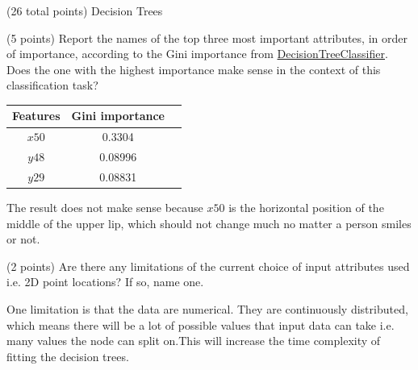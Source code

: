 \documentclass[12pt]{article}
\begin{document}
\begin{question}{(26 total points) Decision Trees}
\begin{subquestion}
\end{subquestion}


%
%
\begin{subquestion}{(5 points) 
Report the names of the top three most important attributes, in order of importance, according to the Gini importance from \href{https://scikit-learn.org/0.19/modules/generated/sklearn.tree.DecisionTreeClassifier.html}{DecisionTreeClassifier}. 
Does the one with the highest importance make sense in the context of this classification task? \\
}


\begin{answerbox}{10em}
\begin{center}
\begin{tabular}{ | c | c | c | }
 \hline
 Features & Gini importance \\ \hline 
 $x50$ & 0.3304 \\
 $y48$ & 0.08996 \\
 $y29$ & 0.08831 \\
 \hline
\end{tabular}
\end{center}
The result does not make sense because $x50$ is
the horizontal position of the middle of the upper lip, which should not change much no matter a person smiles or not.
\end{answerbox}



\end{subquestion}



%
%
\begin{subquestion}{(2 points) 
Are there any limitations of the current choice of input attributes used i.e. 2D point locations? If so, name one. 
}


\begin{answerbox}{10em}
One limitation is that the data are numerical. They are continuously distributed, which means there will be a lot of
possible values that input data can take i.e. many values the node can split on.This will increase the time complexity of fitting the decision trees.
\end{answerbox}



\end{subquestion}


\end{question}
\end{document}
